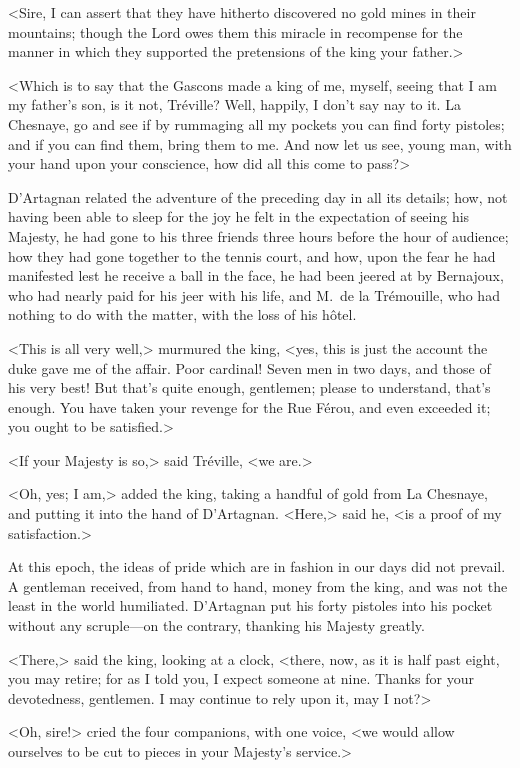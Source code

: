 <Sire, I can assert that they have hitherto discovered no gold mines in their mountains; though the Lord owes them this miracle in recompense for the manner in which they supported the pretensions of the king your father.> 

<Which is to say that the Gascons made a king of me, myself, seeing that I am my father's son, is it not, Tréville? Well, happily, I don't say nay to it. La Chesnaye, go and see if by rummaging all my pockets you can find forty pistoles; and if you can find them, bring them to me. And now let us see, young man, with your hand upon your conscience, how did all this come to pass?> 

D'Artagnan related the adventure of the preceding day in all its details; how, not having been able to sleep for the joy he felt in the expectation of seeing his Majesty, he had gone to his three friends three hours before the hour of audience; how they had gone together to the tennis court, and how, upon the fear he had manifested lest he receive a ball in the face, he had been jeered at by Bernajoux, who had nearly paid for his jeer with his life, and M.~de la Trémouille, who had nothing to do with the matter, with the loss of his hôtel. 

<This is all very well,> murmured the king, <yes, this is just the account the duke gave me of the affair. Poor cardinal! Seven men in two days, and those of his very best! But that's quite enough, gentlemen; please to understand, that's enough. You have taken your revenge for the Rue Férou, and even exceeded it; you ought to be satisfied.> 

<If your Majesty is so,> said Tréville, <we are.> 

<Oh, yes; I am,> added the king, taking a handful of gold from La Chesnaye, and putting it into the hand of D'Artagnan. <Here,> said he, <is a proof of my satisfaction.> 

At this epoch, the ideas of pride which are in fashion in our days did not prevail. A gentleman received, from hand to hand, money from the king, and was not the least in the world humiliated. D'Artagnan put his forty pistoles into his pocket without any scruple—on the contrary, thanking his Majesty greatly. 

<There,> said the king, looking at a clock, <there, now, as it is half past eight, you may retire; for as I told you, I expect someone at nine. Thanks for your devotedness, gentlemen. I may continue to rely upon it, may I not?> 

<Oh, sire!> cried the four companions, with one voice, <we would allow ourselves to be cut to pieces in your Majesty's service.> 

